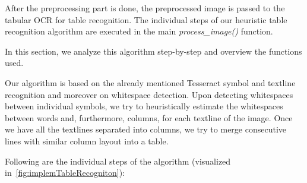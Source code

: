 After the preprocessing part is done, the preprocessed image is passed to the tabular OCR for table recognition. The individual steps of our heuristic table recognition algorithm are executed in the main \emph{process\_image()} function.

In this section, we analyze this algorithm step-by-step and overview the functions used.

Our algorithm is based on the already mentioned Tesseract symbol and textline recognition and moreover on whitespace detection. Upon detecting whitespaces between individual symbols, we try to heuristically estimate the whitespaces between words and, furthermore, columns, for each textline of the image. Once we have all the textlines separated into columns, we try to merge consecutive lines with similar column layout into a table.  

Following are the individual steps of the algorithm (visualized in~\cref{fig:implemTableRecogniton}):

